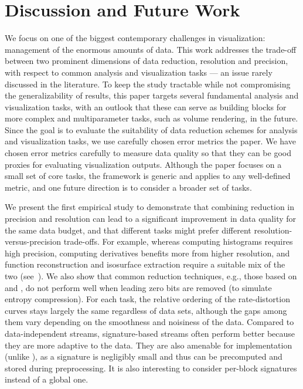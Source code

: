 \section{Discussion and Future Work}

We focus on one of the biggest contemporary challenges in visualization: management of the enormous
amounts of data. This work addresses the trade-off between two prominent dimensions of data
reduction, resolution and precision, with respect to common analysis and visualization tasks --- an
issue rarely discussed in the literature. To keep the study tractable while not compromising the
generalizability of results, this paper targets several fundamental analysis and visualization
tasks, with an outlook that these can serve as building blocks for more complex and multiparameter
tasks, such as volume rendering, in the future. Since the goal is to evaluate the suitability of
data reduction schemes for analysis and visualization tasks, we use carefully chosen error metrics
the paper. We have chosen error metrics carefully to measure data quality so that they can be good
proxies for evaluating visualization outputs. Although the paper focuses on a small set of core
tasks, the framework is generic and applies to any well-defined metric, and one future direction is
to consider a broader set of tasks.

We present the first empirical study to demonstrate that combining reduction in precision and
resolution can lead to a significant improvement in data quality for the same data budget, and that
different tasks might prefer different resolution-versus-precision trade-offs. For example, whereas
computing histograms requires high precision, computing derivatives benefits more from higher
resolution, and function reconstruction and isosurface extraction require a suitable mix of the two
(see~). We also show that common reduction techniques, e.g., those based on
\slvl and \smag, do not perform well when leading zero bits are removed (to simulate entropy
compression). For each task, the relative ordering of the rate-distortion curves stays
largely the same regardless of data sets, although the gaps among them vary depending on the
smoothness and noisiness of the data. Compared to data-independent streams, signature-based streams
often perform better because they are more adaptive to the data. They are also amenable for
implementation (unlike \sopt), as a signature is negligibly small and thus can be precomputed and
stored during preprocessing. It is also interesting to consider per-block signatures instead of a
global one.


